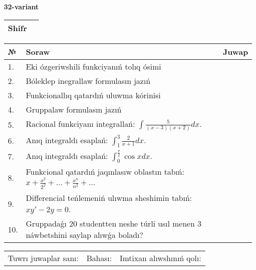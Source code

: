 \documentclass{article}
\begin{document}
  \egroup
  
  \newpage
  
  
  \textbf{32-variant}\\
  
  \bgroup
  \def\arraystretch{1.6} %
  
  \begin{tabular}{|m{5.7cm}|m{9.5cm}|}
  \hline
  Shifr & \\
  \hline
  \end{tabular}
  
  \vspace{1cm}
  
  \begin{tabular}{|m{0.7cm}|m{10cm}|m{4cm}|}
  \hline
  № & Soraw & Juwap \\
  \hline
  1. & Eki ózgeriwshili funkciyanıń tolıq ósimi &  \\
  \hline
  2. & Bóleklep inegrallaw formulasın jazıń &  \\
  \hline
  3. & Funkcionallıq qatardıń uluwma kórinisi &  \\
  \hline
  4. & Gruppalaw formulasın jazıń &  \\
  \hline
  5. & Racional funkciyanı integrallań: \(\int{\frac{5}{(x - 3)(x + 2)}dx}\). &  \\
  \hline
  6. & Anıq integraldı esaplań: \(\int_{1}^{3}\frac{2}{x + 1}dx\). &  \\
  \hline
  7. & Anıq integraldı esaplań: \(\int_{0}^{\frac{\pi}{2}}{\cos xdx}\). &  \\
  \hline
  8. & Funkcional qatardıń jaqınlasıw oblastın tabıń: \(x + \frac{x^2 }{2^2 } + ... + \frac{x^{n}}{n^2 } + ...\) &  \\
  \hline
  9. & Differencial teńlemeniń ulıwma sheshimin tabıń: \(xy' - 2y = 0\). &  \\
  \hline
  10. & Gruppadaǵı 20 studentten neshe túrli usıl menen 3 náwbetshini saylap alıwǵa boladı? &  \\
  \hline
  \end{tabular}
  
  \vspace{1cm}
  
  \begin{tabular}{lll}
  Tuwrı juwaplar sanı: \underline{\hspace{1.5cm}} & 
  Bahası: \underline{\hspace{1.5cm}} & 
  Imtixan alıwshınıń qolı: \underline{\hspace{2cm}} \\
  \end{tabular}
  
\end{document}

